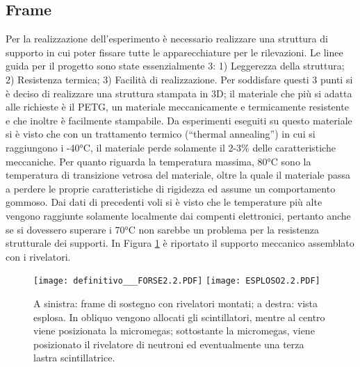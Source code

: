 \subsection*{Frame}

Per la realizzazione dell’esperimento è necessario realizzare una struttura di supporto in cui poter fissare tutte le apparecchiature per le rilevazioni. Le linee guida per il progetto sono state essenzialmente 3: 1) Leggerezza della struttura; 2) Resistenza termica; 3) Facilità di realizzazione. Per soddisfare questi 3 punti si è deciso di realizzare una struttura stampata in 3D; il materiale che più si adatta alle richieste è il PETG, un materiale meccanicamente e termicamente resistente e che inoltre è facilmente stampabile. Da esperimenti eseguiti su questo materiale si è visto che con un trattamento termico (“thermal annealing”) in cui si raggiungono i -40°C, il materiale perde solamente il 2-3\% delle caratteristiche meccaniche. Per quanto riguarda la temperatura massima, 80°C sono la temperatura di transizione vetrosa del materiale, oltre la quale il materiale passa a perdere le proprie caratteristiche di rigidezza ed assume un comportamento gommoso. Dai dati di precedenti voli si è visto che le temperature più alte vengono raggiunte solamente localmente dai compenti elettronici, pertanto anche se si dovessero superare i 70°C non sarebbe un problema per la resistenza strutturale dei supporti. In Figura \ref{frame} è riportato il supporto meccanico assemblato con i rivelatori.
\begin{figure}
    
    \texttt{[image: definitivo\_\_\_FORSE2.2.PDF]}
    \texttt{[image: ESPLOSO2.2.PDF]}

    \caption{A sinistra: frame di sostegno con rivelatori montati; a destra: vista esplosa. In obliquo vengono allocati gli scintillatori, mentre al centro viene posizionata la micromegas; sottostante la micromegas, viene posizionato il rivelatore di neutroni ed eventualmente una terza lastra scintillatrice.}
    \label{frame}

\end{figure}
